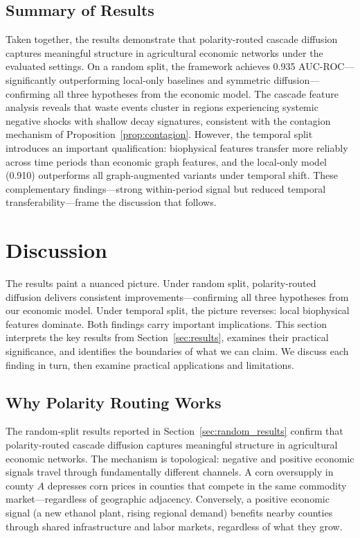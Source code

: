 \documentclass[preprint,12pt,authoryear]{elsarticle}
\begin{document}
\subsection{Summary of Results}
\label{sec:results_summary}

Taken together, the results demonstrate that polarity-routed cascade diffusion captures meaningful structure in agricultural economic networks under the evaluated settings. On a random split, the framework achieves 0.935 AUC-ROC---significantly outperforming local-only baselines and symmetric diffusion---confirming all three hypotheses from the economic model. The cascade feature analysis reveals that waste events cluster in regions experiencing systemic negative shocks with shallow decay signatures, consistent with the contagion mechanism of Proposition~\ref{prop:contagion}. However, the temporal split introduces an important qualification: biophysical features transfer more reliably across time periods than economic graph features, and the local-only model (0.910) outperforms all graph-augmented variants under temporal shift. These complementary findings---strong within-period signal but reduced temporal transferability---frame the discussion that follows.


\section{Discussion}
\label{sec:discussion}

The results paint a nuanced picture. Under random split, polarity-routed diffusion delivers consistent improvements---confirming all three hypotheses from our economic model. Under temporal split, the picture reverses: local biophysical features dominate. Both findings carry important implications. This section interprets the key results from Section~\ref{sec:results}, examines their practical significance, and identifies the boundaries of what we can claim. We discuss each finding in turn, then examine practical applications and limitations.

\subsection{Why Polarity Routing Works}

The random-split results reported in Section~\ref{sec:random_results} confirm that polarity-routed cascade diffusion captures meaningful structure in agricultural economic networks. The mechanism is topological: negative and positive economic signals travel through fundamentally different channels. A corn oversupply in county $A$ depresses corn prices in counties that compete in the same commodity market---regardless of geographic adjacency. Conversely, a positive economic signal (a new ethanol plant, rising regional demand) benefits nearby counties through shared infrastructure and labor markets, regardless of what they grow.
\end{document}
